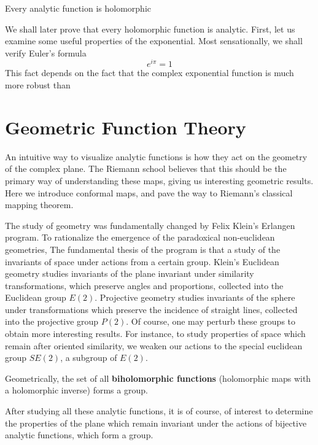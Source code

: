 \begin{corollary}
    Every analytic function is holomorphic
\end{corollary}

We shall later prove that every holomorphic function is analytic. First, let us examine some useful properties of the exponential. Most sensationally, we shall verify Euler's formula
%
\[ e^{i \pi} = 1 \]
%
This fact depends on the fact that the complex exponential function is much more robust than 



\chapter{Geometric Function Theory}

An intuitive way to visualize analytic functions is how they act on the geometry of the complex plane. The Riemann school believes that this should be the primary way of understanding these maps, giving us interesting geometric results. Here we introduce conformal maps, and pave the way to Riemann's classical mapping theorem.

The study of geometry was fundamentally changed by Felix Klein's Erlangen program. To rationalize the emergence of the paradoxical non-euclidean geometries, The fundamental thesis of the program is that a study of the invariants of space under actions from a certain group. Klein's Euclidean geometry studies invariants of the plane invariant under similarity transformations, which preserve angles and proportions, collected into the Euclidean group $E(2)$. Projective geometry studies invariants of the sphere under transformations which preserve the incidence of straight lines, collected into the projective group $P(2)$. Of course, one may perturb these groups to obtain more interesting results. For instance, to study properties of space which remain after oriented similarity, we weaken our actions to the special euclidean group $SE(2)$, a subgroup of $E(2)$.

Geometrically, the set of all {\bf biholomorphic functions} (holomorphic maps with a holomorphic inverse) forms a group.

After studying all these analytic functions, it is of course, of interest to determine the properties of the plane which remain invariant under the actions of bijective analytic functions, which form a group.


